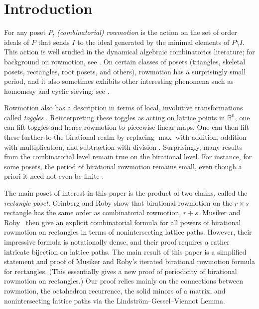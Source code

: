 \documentclass[11pt]{article}
\theoremstyle{definition}
\numberwithin{equation}{section}
\numberwithin{equation}{section}
\begin{document}
\section{Introduction}

For any poset $P$, \emph{(combinatorial) rowmotion} is the action on the set of order ideals of $P$ that sends $I$ to the ideal generated by the minimal elements of $P \setminus I$. This action is well studied in the dynamical algebraic combinatorics literature; for background on rowmotion, see \cite{strikerwilliams}. %
On certain classes of posets (triangles, skeletal posets, rectangles, root posets, and others), rowmotion has a surprisingly small period, and it also sometimes exhibits other interesting phenomena such as homomesy and cyclic sieving: see \cite{einsteinpropp1,hopkins3,josephroby1,musikerroby,propproby,thomaswilliams}.

Rowmotion also has a description in terms of local, involutive transformations called \emph{toggles} \cite{cameronfonderflaass}. Reinterpreting these toggles as acting on lattice points in $\mathbb R^n$, one can lift toggles and hence rowmotion to piecewise-linear maps. One can then lift these further to the birational realm by replacing $\max$ with addition, addition with multiplication, and subtraction with division \cite{einsteinpropp2,einsteinpropp1}. Surprisingly, many results from the combinatorial level remain true on the birational level. For instance, for some posets, the period of birational rowmotion remains small, even though a priori it need not even be finite \cite{grinbergroby2,grinbergroby1}.

The main poset of interest in this paper is the product of two chains, called the \emph{rectangle poset}. Grinberg and Roby \cite{grinbergroby2} show that birational rowmotion on the $r \times s$ rectangle has the same order as combinatorial rowmotion, $r+s$.  Musiker and Roby~\cite{musikerroby} then give an explicit combinatorial formula for all powers of birational rowmotion on rectangles in terms of nonintersecting lattice paths. However, their impressive formula is notationally dense, and their proof requires a rather intricate bijection on lattice paths. The main result of this paper is a simplified statement and proof of Musiker and Roby's iterated birational rowmotion formula for rectangles. (This essentially gives a new proof of periodicity of birational rowmotion on rectangles.) Our proof relies mainly on the connections between rowmotion, the octahedron recurrence, the solid minors of a matrix, and nonintersecting lattice paths via the Lindstr\"om--Gessel--Viennot Lemma.
\end{document}
